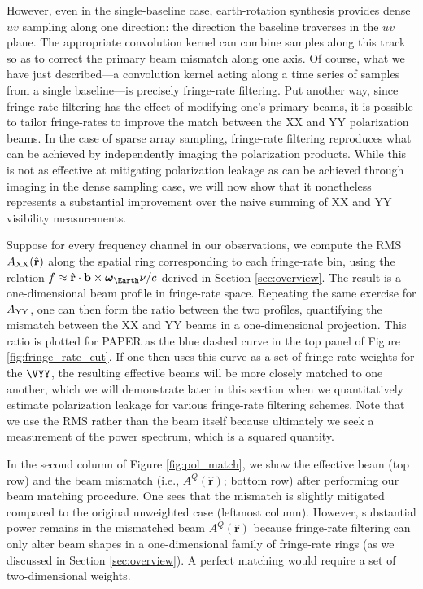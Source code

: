 \documentclass[twocolumn,apj,numberedappendix]{emulateapj}
\newcommand{\rhat}{\hat{\mathbf{r}}}
\begin{document}
However, even in the single-baseline case, earth-rotation synthesis provides dense $uv$ sampling along one direction: the
direction the baseline traverses in the $uv$ plane.  The appropriate
convolution kernel can combine samples along this track so as to correct the primary beam mismatch along one axis.
Of course, what we have just described---a convolution kernel acting along a time series
of samples from a single baseline---is precisely fringe-rate filtering.  Put another way, since fringe-rate filtering has the effect of modifying one's primary beams, it is possible to tailor fringe-rates to improve the match between the XX and YY polarization beams. In the case of sparse array sampling, fringe-rate filtering reproduces what can be achieved by independently
imaging the polarization products.  While this is not as effective at mitigating polarization leakage as can be achieved
through imaging in the dense sampling case, we will now show that it nonetheless represents a substantial improvement
over the naive summing of XX and YY visibility measurements.

Suppose for every frequency channel in our observations, we compute the RMS $A_{\rm XX} (\rhat)$ along
the spatial ring corresponding to each fringe-rate bin, using the relation $f \approx \rhat \cdot \mathbf{b}
\times \boldsymbol \omega_\Earth \nu / c$ derived in Section \ref{sec:overview}. The result is
a one-dimensional beam profile in fringe-rate space. Repeating the same exercise for $A_{\rm YY}$,
one can then form the ratio between the two profiles, quantifying the mismatch between the XX and YY
beams in a one-dimensional projection. This ratio is plotted for PAPER as the blue dashed curve in the
top panel of Figure \ref{fig:fringe_rate_cut}. If one then uses this curve as a set of fringe-rate weights
for the $\VYY$, the resulting effective beams will be more closely matched to one another, which we
will demonstrate later in this section when we quantitatively estimate polarization leakage for various fringe-rate filtering
schemes. Note that
we use the RMS rather than the beam itself because ultimately we seek a measurement
of the power spectrum, which is a squared quantity.

In the second column of Figure \ref{fig:pol_match}, we show the effective beam (top row) and the beam
mismatch (i.e., $A^Q (\rhat)$; bottom row) after performing our beam matching procedure. One sees
that the mismatch is slightly mitigated compared to the original unweighted case (leftmost column).
However, substantial power remains in the mismatched beam $A^Q (\rhat)$ because fringe-rate
filtering can only alter beam shapes in a one-dimensional family of fringe-rate rings (as we discussed in
Section \ref{sec:overview}). A perfect matching would require a set of two-dimensional weights.
\end{document}
